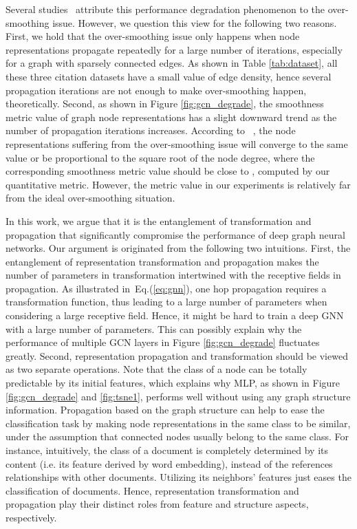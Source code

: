 \documentclass[sigconf]{acmart}
\begin{document}
Several studies~\cite{li2018deeper,chen2019measuring} attribute this
performance degradation phenomenon to the over-smoothing issue.
However, we question this view for the following two reasons.
First, we hold that the over-smoothing issue only happens when
node representations propagate repeatedly for a large number of
iterations, especially for a graph with sparsely connected edges.
As shown in Table \ref{tab:dataset}, all these three citation
datasets have a small value of edge density, hence several
propagation iterations are not enough to make over-smoothing
happen, theoretically. Second, as shown in Figure
\ref{fig:gcn_degrade}, the smoothness metric value of graph node
representations has a slight downward trend as the number of
propagation iterations increases. According to
~\cite{li2018deeper}, the node representations suffering from the
over-smoothing issue will converge to the same value or be
proportional to the square root of the node degree, where the
corresponding smoothness metric value should be close to ,
computed by our quantitative metric. However, the metric value in
our experiments is relatively far from the ideal over-smoothing
situation.


In this work, we argue that it is the entanglement of transformation and propagation that significantly compromise the performance of
deep graph neural networks. Our argument is originated from the
following two intuitions. First, the entanglement of representation
transformation and propagation makes the number of parameters in
transformation intertwined with the receptive fields in
propagation. As illustrated in~Eq.(\ref{eq:gnn}), one hop
propagation requires a transformation function, thus leading to
a large number of parameters when considering a large receptive
field. Hence, it might be hard to train a deep GNN with a large number of parameters.
This can possibly explain why the performance of multiple GCN
layers in Figure \ref{fig:gcn_degrade} fluctuates greatly.
Second, representation propagation and transformation should be viewed
as two separate operations. Note that the class of a node can be
totally predictable by its initial features, which explains why
MLP, as shown in Figure \ref{fig:gcn_degrade} and
\ref{fig:tsne1}, performs well without using any graph structure
information. Propagation based on the graph structure can
help to ease the classification task by making node representations in
the same class to be similar, under the assumption that connected
nodes usually belong to the same class. For instance,
intuitively, the class of a document is completely determined by
its content (i.e. its feature derived by word embedding), instead
of the references relationships with other documents. Utilizing
its neighbors' features just eases the classification of
documents. Hence, representation transformation and propagation play
their distinct roles from feature and structure aspects,
respectively.
\end{document}
